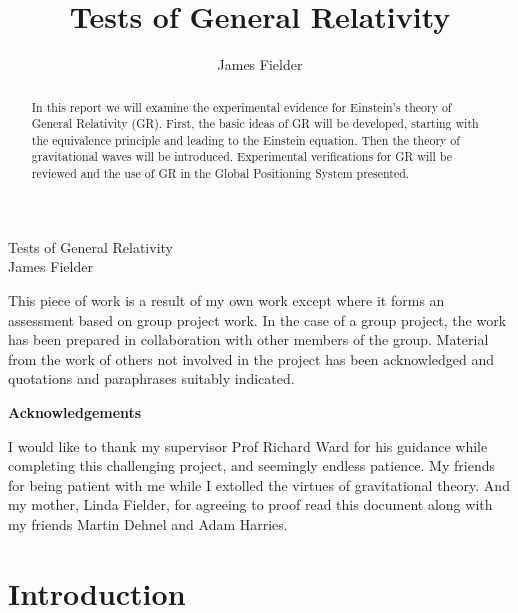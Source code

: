 \documentclass[a4paper,11pt,notitlepage,twoside]{report}
\author{James Fielder}
\date{}
\title{Tests of General Relativity}
\begin{document}
\begin{titlepage}
\thispagestyle{empty}
\begin{center}
{\Huge Tests of General Relativity} \\[10cm]
{\Large James Fielder}
\end{center}
\end{titlepage}

\pagebreak



\thispagestyle{empty} 


\begin{abstract}
\noindent In this report we will examine the experimental evidence for Einstein's theory of General Relativity (GR).
First, the basic ideas of GR will be developed, starting with the equivalence principle and leading to the Einstein equation.
Then the theory of gravitational waves will be introduced. Experimental verifications for GR will be reviewed and the use of GR in the
Global Positioning System presented. \\[6cm]
\end{abstract} 

\begin{center}
This piece of work is a result of my own work except where it forms an assessment based on group project work. 
In the case of a group project, the work has been prepared in collaboration with other members of the group. 
Material from the work of others not involved in the project has been acknowledged and quotations and paraphrases suitably indicated. \\[6cm]
\end{center}

\begin{center}
\textbf{Acknowledgements}

I would like to thank my supervisor Prof Richard Ward for his guidance while completing this challenging project, and seemingly endless patience. My friends for being patient with me while I extolled the virtues of gravitational theory. And my mother, Linda Fielder, for agreeing to proof read this document along with my friends Martin Dehnel and Adam Harries.
\end{center}
\thispagestyle{empty}


\tableofcontents
\thispagestyle{empty}
\clearpage
\listoffigures
\thispagestyle{empty}

\chapter{Introduction}
\end{document}
